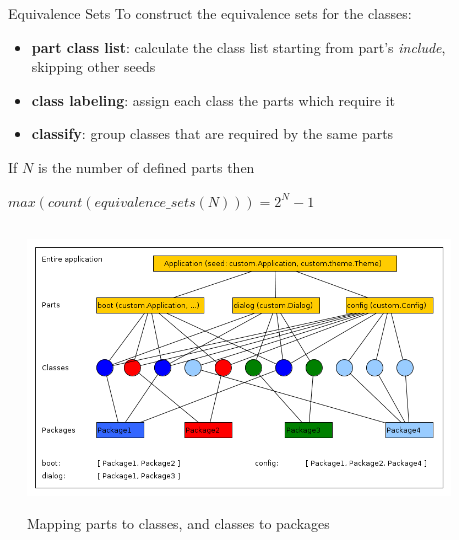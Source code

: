 \documentclass[final]{beamer}
\newlength{\sepwid}
\newlength{\onecolwid}
\newlength{\twocolwid}
\begin{document}
\begin{frame}[t]
\begin{columns}[t]
\begin{column}{\twocolwid}
\begin{columns}[t,totalwidth=\twocolwid]
    \begin{column}{\sepwid}\end{column}			%
    \begin{column}{\onecolwid}
      \begin{block}{Equivalence Sets}
        To construct the equivalence sets for the classes:
        \begin{itemize}\justifying
          \item \textbf{part class list}: calculate the class list starting from
            part's \textit{include}, skipping other seeds
          \item \textbf{class labeling}: assign each class the parts which require it
          \item \textbf{classify}: group classes that are required by the same parts
        \end{itemize}
        If $N$ is the number of defined parts then\\
        \begin{center}
          $ max(count(equivalence\_sets(N))) = 2^{N} - 1 $
        \end{center}
      \end{block}
    \end{column}

    \end{columns}


    \begin{figure}   %
      \begin{center}
        \includegraphics[width=20in]{g_part_layers.png} \\
        \caption{Mapping parts to classes, and classes to packages}
        \label{fig:corrSubsys}
      \end{center}
    \end{figure}


\end{column}
\end{columns}
\end{frame}
\end{document}
